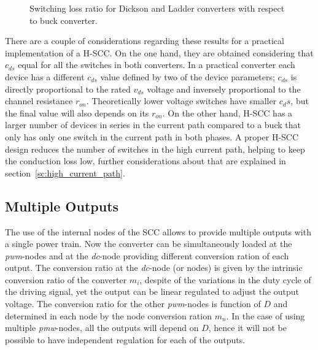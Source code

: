 \begin{SCfigure}
\centering
{}
\caption{Switching loss ratio for Dickson and Ladder converters with respect to buck converter.}
\label{fig:psw_ratio}
\end{SCfigure}

There are a couple of considerations regarding these results for a practical implementation of a H-SCC. On the one hand, they are obtained considering that $c_{ds}$ equal for all the switches in both converters. In a practical converter each device has a different $c_{ds}$ value defined by two of the device parameters; $c_{ds}$ is directly proportional to the rated $v_{ds}$  voltage and inversely proportional to the channel resistance $r_{on}$. Theoretically lower voltage switches have smaller $c_ds$, but the final value will also depends on its $r_{on}$. On the other hand, H-SCC has a larger number of devices in series in the current path compared to a buck that only has only one switch in the current path in both phases. A proper H-SCC design reduces the number of switches in the high current path, helping to keep the conduction loss low, further considerations about that are explained in  section~\ref{sc:high_current_path}.



\subsection{Multiple Outputs}

The use of the internal nodes of the SCC allows to provide multiple outputs with a single power train. Now the converter can be simultaneously loaded at the \emph{pwm}-nodes and at the \emph{dc}-node providing different conversion ration of each output. The conversion ratio at the \emph{dc}-node (or nodes)  is given by the intrinsic conversion ratio of the converter $m_i$, despite of the variations in the duty cycle of the driving signal, yet the output can be linear regulated to adjust the output voltage.  The conversion ratio for the other \emph{pwm}-nodes is function of $D$ and determined in each node by the node conversion ration $m_n$. In the case of using multiple \emph{pmw}-nodes, all the outputs will depend on $D$, hence it will not be possible to have independent regulation for each of the outputs.

